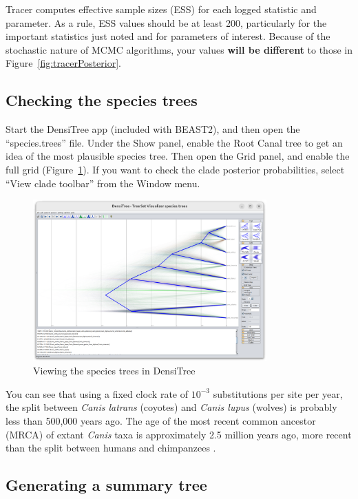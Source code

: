 \documentclass[12pt]{article}
\begin{document}
Tracer computes effective sample sizes (ESS) for each logged statistic and
parameter. As a rule, ESS values should be at least 200, particularly for
the important statistics just noted and for parameters of interest. Because of the stochastic
nature of MCMC algorithms, your values \textbf{will be different} to those in
Figure~\ref{fig:tracerPosterior}.

\subsection{Checking the species trees}
\label{subsec:checkTrees}

Start the DensiTree app (included with BEAST2), and then open the
``species.trees'' file. Under the Show panel, enable the Root Canal tree to
get an idea of the most plausible species tree. Then open the Grid panel, and
enable the full grid (Figure~\ref{fig:densitree}). If you want to check the
clade posterior probabilities, select ``View clade toolbar'' from the Window menu.

\begin{figure}[htb!]
\centering
\includegraphics[width=0.8\textwidth]{figures/densitree.png}
\caption
{Viewing the species trees in DensiTree}
\label{fig:densitree}
\end{figure}

You can see that using a fixed clock rate of $10^{-3}$ substitutions per site
per year, the split between \textit{Canis latrans} (coyotes) and \textit{Canis lupus}
(wolves) is probably less than 500,000 years ago. The age of the most
recent common ancestor (MRCA) of extant \textit{Canis} taxa is approximately 2.5 million
years ago, more recent than the split between humans and chimpanzees \parencite{PradoMartinez2013}.

\subsection{Generating a summary tree}
\label{subsec:makeSummaryTree}
\end{document}
